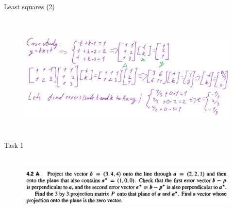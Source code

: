 \documentclass[aspectratio=169]{beamer}
\begin{document}
            \begin{frame}[t]{Least squares (2)}
                \framesubtitle{}
                    \begin{figure}[H]
                        \centering\includegraphics[height=6cm,width=1\textwidth,keepaspectratio]{AGLA2_for_slides_6.png}
                        \label{fig:AGLA2_for_slides_6.png}
                    \end{figure}
                \end{frame}

    \begin{frame}[t]{Task 1}
        \framesubtitle{}
        \begin{figure}[H]
            \centering\includegraphics[height=3cm,width=1\textwidth,keepaspectratio]{1.png}
            \label{fig:1.png}
        \end{figure}
    \end{frame}
\end{document}
